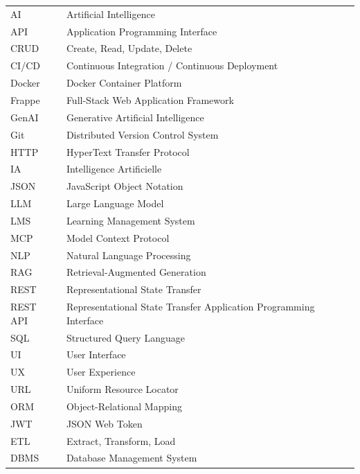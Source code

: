 \documentclass[12pt,a4paper,oneside]{report}
\begin{document}
\begin{tabular}{ll}
AI & Artificial Intelligence \\
API & Application Programming Interface \\
CRUD & Create, Read, Update, Delete \\
CI/CD & Continuous Integration / Continuous Deployment \\
Docker & Docker Container Platform \\
Frappe & Full-Stack Web Application Framework \\
GenAI & Generative Artificial Intelligence \\
Git & Distributed Version Control System \\
HTTP & HyperText Transfer Protocol \\
IA & Intelligence Artificielle \\
JSON & JavaScript Object Notation \\
LLM & Large Language Model \\
LMS & Learning Management System \\
MCP & Model Context Protocol \\
NLP & Natural Language Processing \\
RAG & Retrieval-Augmented Generation \\
REST & Representational State Transfer \\
REST API & Representational State Transfer Application Programming Interface \\
SQL & Structured Query Language \\
UI & User Interface \\
UX & User Experience \\
URL & Uniform Resource Locator \\
ORM & Object-Relational Mapping \\
JWT & JSON Web Token \\
ETL & Extract, Transform, Load \\
DBMS & Database Management System \\
\end{tabular}

\tableofcontents

\listoffigures

\listoftables


\clearpage
{}
\end{document}
